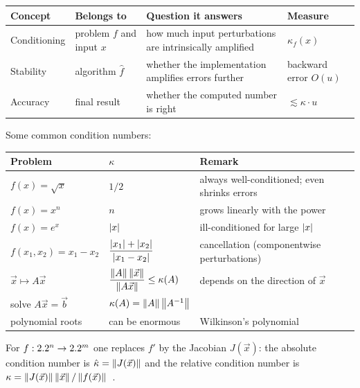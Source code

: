 \begin{center}
\begin{tabular}{l p{} p{} l}
  \toprule
  Concept & Belongs to & Question it answers & Measure \\
  \midrule
  Conditioning & problem $f$ and input $x$ & how much input perturbations are intrinsically amplified & $\kappa_f(x)$ \\
  Stability & algorithm $\hat{f}$ & whether the implementation amplifies errors further & backward error $O(u)$ \\
  Accuracy & final result & whether the computed number is right & $\lesssim \kappa \cdot u$ \\
  \bottomrule
\end{tabular}
\end{center}

Some common condition numbers:
\begin{center}
\begin{tabular}{lll}
  \toprule
  Problem & $\kappa$ & Remark \\
  \midrule
  $f(x) = \sqrt{x}$ & $1/2$ & always well-conditioned; even shrinks errors \\
  $f(x) = x^n$ & $n$ & grows linearly with the power \\
  $f(x) = e^x$ & $\left\lvert x \right\rvert$ & ill-conditioned for large $\left\lvert x \right\rvert$ \\
  $f(x_1, x_2) = x_1 - x_2$ & $\dfrac{\left\lvert x_1 \right\rvert + \left\lvert x_2 \right\rvert}{\left\lvert x_1 - x_2 \right\rvert}$ & cancellation (componentwise perturbations) \\
  $\vec{x} \mapsto A\vec{x}$ & $\dfrac{\left\lVert A \right\rVert\left\lVert \vec{x} \right\rVert}{\left\lVert A\vec{x} \right\rVert} \le \kappa(A)$ & depends on the direction of $\vec{x}$ \\
  solve $A\vec{x} = \vec{b}$ & $\kappa(A) = \left\lVert A \right\rVert\left\lVert A^{-1} \right\rVert$ & \\
  polynomial roots & can be enormous & Wilkinson's polynomial \\
  \bottomrule
\end{tabular}
\end{center}
For $f : 2.2^n \to 2.2^m$ one replaces $f'$ by the Jacobian $J(\vec{x})$: the absolute condition number is $\hat{\kappa} = \left\lVert J(\vec{x}) \right\rVert$ and the relative condition number is $\kappa = \left\lVert J(\vec{x}) \right\rVert\left\lVert \vec{x} \right\rVert/\left\lVert f(\vec{x}) \right\rVert$~\cite[Lecture 12]{TB}.


